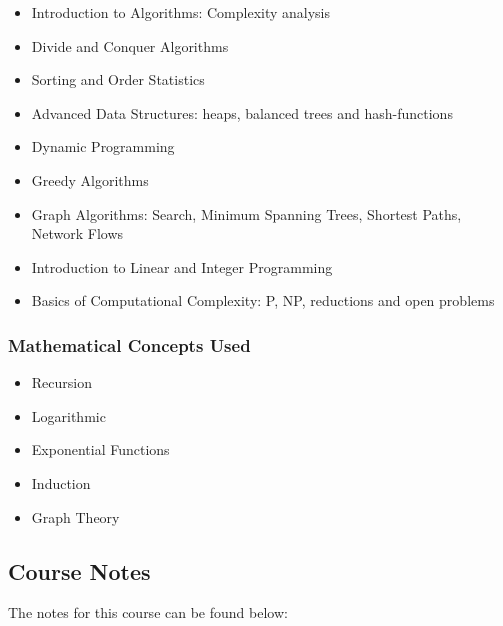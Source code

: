 {\begin{highlight}[\CSPBAlgo]
        \begin{itemize}
            \item Introduction to Algorithms: Complexity analysis
            \item Divide and Conquer Algorithms
            \item Sorting and Order Statistics
            \item Advanced Data Structures: heaps, balanced trees and hash-functions
            \item Dynamic Programming
            \item Greedy Algorithms
            \item Graph Algorithms: Search, Minimum Spanning Trees, Shortest Paths, Network Flows
            \item Introduction to Linear and Integer Programming
            \item Basics of Computational Complexity: P, NP, reductions and open problems
        \end{itemize}
    
        \subsubsection*{Mathematical Concepts Used}
        
        \begin{itemize}
            \item Recursion
            \item Logarithmic
            \item Exponential Functions
            \item Induction
            \item Graph Theory
        \end{itemize}
    \end{highlight}
}

\subsection{Course Notes}

The notes for this course can be found below: 